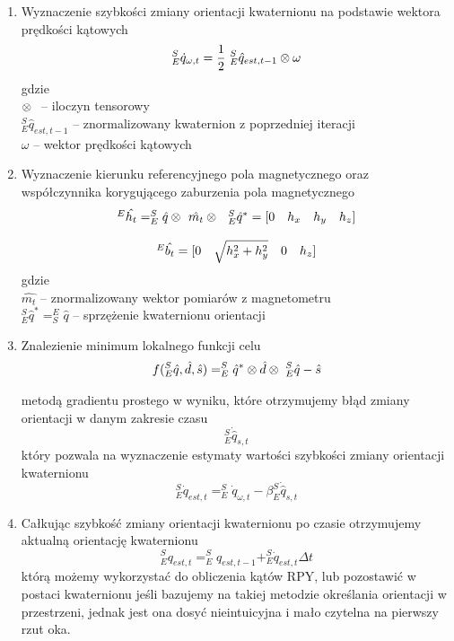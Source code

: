\begin{enumerate}
    \item Wyznaczenie szybkości zmiany orientacji kwaternionu na podstawie wektora prędkości kątowych
    $$
        _E^S \Dot{q}_{\omega,t} = \frac{1}{2} \ _E^S \hat{q}_{est,t-1} \tens \ \omega
    $$
    gdzie \\
    $ \mathbin{\mathop{\otimes}\displaylimits_{\ }}$ -- iloczyn tensorowy \\
    $ _E^S \hat{q}_{est,t-1} $ -- znormalizowany kwaternion z poprzedniej iteracji\\
    $ \omega $ -- wektor prędkości kątowych
    \item Wyznaczenie kierunku referencyjnego pola magnetycznego oraz współczynnika korygującego zaburzenia pola magnetycznego
    $$
        \begin{array}{cc}
            ^E \hat{h_t} = _E^S \hat{q} \mathbin{\mathop{\otimes}\displaylimits_{\ }}\hat{m_t} \mathbin{\mathop{\otimes}\displaylimits_{\ }}\ _E^S \hat{q}^{*} = [0 \quad h_x \quad h_y \quad h_z] \\ \\
            ^E \hat{b_t} = [0 \quad \sqrt{h_x^2 + h_y^2} \quad 0 \quad h_z]
        \end{array}
    $$
    gdzie \\
    $ \hat{m_t} $ -- znormalizowany wektor pomiarów z magnetometru\\
    $ _E^S \hat{q}^{*} = _S^E \hat{q} $ -- sprzężenie kwaternionu orientacji
    \item Znalezienie minimum lokalnego funkcji celu
    $$
        f(_E^S \hat{q}, \hat{d}, \hat{s}) = _E^S \hat{q}^{*} \mathbin{\mathop{\otimes}\displaylimits_{\ }}\hat{d} \mathbin{\mathop{\otimes}\displaylimits_{\ }}\ _E^S \hat{q} - \hat{s}
    $$
    metodą gradientu prostego w wyniku, które otrzymujemy błąd zmiany orientacji w danym zakresie czasu
    $$
        _E^S \Dot{\hat{q}}_{s,t}
    $$
    który pozwala na wyznaczenie estymaty wartości szybkości zmiany orientacji kwaternionu
    $$
        _E^S \Dot{q}_{est,t} = _E^S \Dot{q}_{\omega,t} - \beta _E^S \Dot{\hat{q}}_{s,t}
    $$
    \item Całkując szybkość zmiany orientacji kwaternionu po czasie otrzymujemy aktualną orientację kwaternionu 
    $$
        _E^S q_{est,t} = _E^S q_{est,t-1} + _E^S \Dot{q}_{est,t} \Delta t
    $$
    którą możemy wykorzystać do obliczenia kątów RPY, lub pozostawić w postaci kwaternionu jeśli bazujemy na takiej metodzie określania orientacji w przestrzeni, jednak jest ona dosyć nieintuicyjna i mało czytelna na pierwszy rzut oka. 
    
\end{enumerate}

